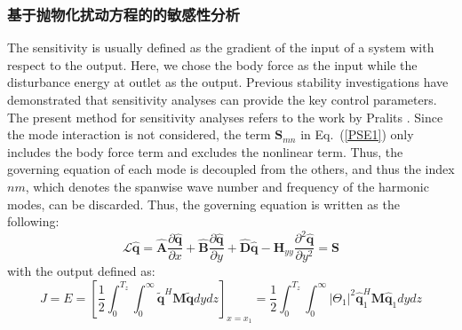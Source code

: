 \subsubsection{基于抛物化扰动方程的的敏感性分析}
The sensitivity is usually defined as the gradient of the input of a system with respect to the output. Here, we chose the body force as the input while the disturbance energy at outlet as the output.
Previous stability investigations \cite{Marquet2008} have demonstrated that sensitivity analyses can provide the key control parameters. The present method for sensitivity analyses refers to the work by Pralits \cite{pralits2000sensitivity}. Since the mode interaction is not considered, the term ${\mathbf{S}}_{mn}$ in Eq.~(\ref{PSE1}) only includes the body force term and excludes the nonlinear term. Thus, the governing equation of each mode is decoupled from the others, and thus the index $nm$, which denotes the spanwise wave number and frequency of the harmonic modes, can be discarded. Thus, the governing equation is written as the following:
\begin{equation}
\label{LPSE1}
    \mathscr{L}{\mathbf{\hat q}}  = {\mathbf{\hat A}}\frac{{\partial {\mathbf{\hat q}} }}
    {{\partial x}} + {\mathbf{\hat B}}\frac{{\partial {\mathbf{\hat q}} }}
    {{\partial y}} + {\mathbf{\hat D\hat q}}  - {\mathbf{H}}_{yy} \frac{{\partial ^2 {\mathbf{\hat q}} }}
    {{\partial y^2 }} = {\mathbf{S}}
\end{equation}
with the output defined as:
\begin{equation}
J = E = \left[ {\frac{1}
{2}\int_0^{T_z } {\int_0^\infty  {{\mathbf{\tilde q}}^H {\mathbf{M\tilde q}}dydz} } } \right]_{x = x_1 }  %
= \frac{1}
{2}\int_0^{T_z } {\int_0^\infty  {\left| {\Theta _1 } \right|^2 {\mathbf{\hat q}}_1 ^H {\mathbf{M\hat q}}_1 dydz} }
\end{equation}
